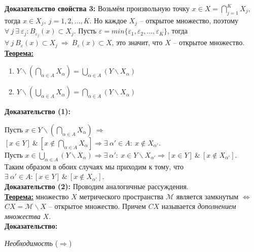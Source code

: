 \documentclass[a4paper,12pt]{article} %
\begin{document}
	\textbf{Доказательство свойства 3:} Возьмём произвольную точку $x \in X = \bigcap \limits_{j = 1}^K X_{j}$, тогда $x \in X_j, ~ j = 1, 2, \dots, K$. Но каждое $X_j$ -- открытое множество, поэтому $\forall ~ j ~ \exists ~ \varepsilon_j : B_{\varepsilon_j}(x) \subset X_j$. Пусть $\varepsilon = min \{\varepsilon_1, \varepsilon_2, \dots, \varepsilon_K \}$, тогда $\forall ~ j ~ B_{\varepsilon}(x) \subset X_j ~ \Rightarrow ~ B_{\varepsilon}(x) \subset X$, это значит, что $X$ -- открытое множество.\\
	
	\underline{\textbf{Теорема:}}
	
	\begin{enumerate}
		\item $Y \backslash (\bigcap \limits_{\alpha \in A} X_{\alpha}) = \bigcup \limits_{\alpha \in A} (Y \backslash X_{\alpha})$
		\item $Y \backslash (\bigcup \limits_{\alpha \in A} X_{\alpha}) = \bigcap \limits_{\alpha \in A} (Y \backslash X_{\alpha})$
	\end{enumerate}
	
	\textbf{Доказательство (1):} 
	
	Пусть $x \in Y \backslash \left(\bigcap \limits_{\alpha \in A} X_{\alpha} \right) ~ \Rightarrow$ $[x \in Y] ~ \& ~ \left[x \notin \bigcap \limits_{\alpha \in A} X_{\alpha} \right] \Rightarrow \exists ~ \alpha' \in A : ~ x \notin X_{\alpha'}$.\\
	
	Пусть $x \in \bigcup \limits_{\alpha \in A} (Y \backslash X_{\alpha}) \Rightarrow \exists ~ \alpha' : ~ x \in Y \backslash X_{\alpha'} \Rightarrow [x \in Y] ~ \& ~ [x \notin X_{\alpha'}]$.\\
	
	Таким образом в обоих случаях мы приходим к тому, что $\exists ~ \alpha' \in A : [x \in Y] ~ \& ~ [x \notin X_{\alpha'}]$.\\
	
	\textbf{Доказательство (2):} Проводим аналогичные рассуждения.\\
	
	\underline{\textbf{Теорема:}} множество $X$ метрического пространства $\mathscr{M}$ является замкнутым $\Leftrightarrow$ $CX = \mathscr{M} \backslash X$ -- открытое множество. Причем $CX$ называется \textit{дополнением множества $X$}.\\
	
	\textbf{Доказательство:} 
	
	\textit{Необходимость} ($\Rightarrow$)\\
	
\end{document}
